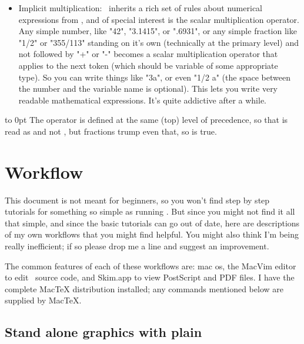 \documentclass[a4paper,landscape]{article}
\begin{document}
\begin{itemize}
    \item Implicit multiplication: \MP\ inherits a rich set of rules about numerical
        expressions from \MF, and of special interest is the scalar multiplication
        operator.  Any simple number, like "42", "3.1415", or ".6931", or any simple
        fraction like "1/2" or "355/113" standing on it’s own (technically at the
        primary level) and not followed by "+" or "-" becomes a scalar
        multiplication operator that applies to the next token (which should be variable
        of some appropriate type).
        So you can write things like "3a", or even "1/2 a"
        (the space between the number and the variable name is optional). This
        lets you write very readable mathematical expressions. It’s quite
        addictive after a while.

\end{itemize}

\vskip -22pt
\vbox to 0pt{\vss\hsize 4in\noindent
The  operator is defined at the same (top) level of precedence, so
that  is read as  and not , but fractions
trump even that, so  is true.}

\newpage
\section{Workflow}

This document is not meant for beginners, so you won't find step by step tutorials
for something so simple as running \MP.  But since you might not find it all that
simple, and since the basic tutorials can go out of date, here are descriptions of
my own workflows that you might find helpful.  You might also think I'm being really
inefficient; if so please drop me a line and suggest an improvement.

The common features of each of these workflows are: mac os, the MacVim editor to
edit \MP\ source code, and
Skim.app to view PostScript and PDF files.  I have the complete MacTeX distribution
installed; any commands mentioned below are supplied by MacTeX.

\subsection{Stand alone graphics with plain \MP}\label{sec:plain-flow}
\end{document}
